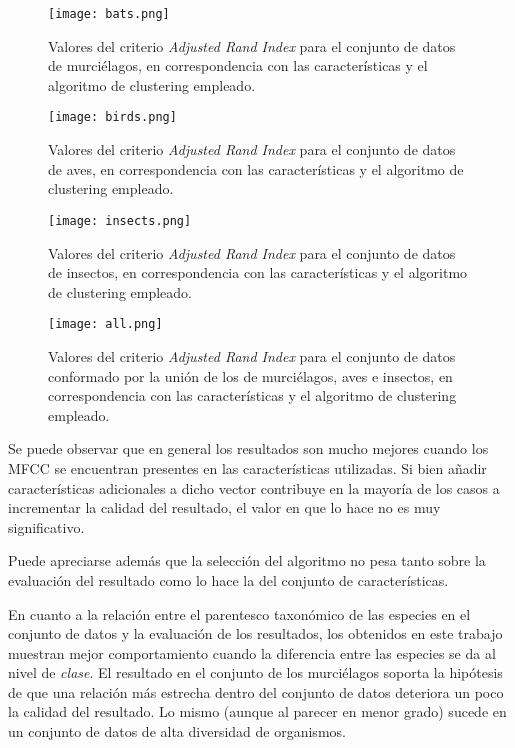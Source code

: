 \begin{figure}[!h]
    \centering
    \texttt{[image: bats.png]}
    \caption{Valores del criterio \textit{Adjusted Rand Index} para el conjunto de datos de murciélagos, en correspondencia con las características y el algoritmo de clustering empleado.}
    \label{img:bats}
\end{figure}

\begin{figure}[!h]
    \centering
    \texttt{[image: birds.png]}
    \caption{Valores del criterio \textit{Adjusted Rand Index} para el conjunto de datos de aves, en correspondencia con las características y el algoritmo de clustering empleado.}
    \label{img:birds}
\end{figure}

\begin{figure}[!h]
    \centering
    \texttt{[image: insects.png]}
    \caption{Valores del criterio \textit{Adjusted Rand Index} para el conjunto de datos de insectos, en correspondencia con las características y el algoritmo de clustering empleado.}
    \label{img:insects}
\end{figure}

\begin{figure}[!h]
    \centering
    \texttt{[image: all.png]}
    \caption{Valores del criterio \textit{Adjusted Rand Index} para el conjunto de datos conformado por la unión de los de murciélagos, aves e insectos, en correspondencia con las características y el algoritmo de clustering empleado.}
    \label{img:all}
\end{figure}

Se puede observar que en general los resultados son mucho mejores cuando los MFCC se encuentran presentes en las características utilizadas.
Si bien añadir características adicionales a dicho vector contribuye en la mayoría de los casos a incrementar la calidad del resultado, el valor en que lo hace no es muy significativo.

Puede apreciarse además que la selección del algoritmo no pesa tanto sobre la evaluación del resultado como lo hace la del conjunto de características.

En cuanto a la relación entre el parentesco taxonómico de las especies en el conjunto de datos y la evaluación de los resultados,
los obtenidos en este trabajo muestran mejor comportamiento cuando la diferencia entre las especies se da al nivel de \textit{clase}.
El resultado en el conjunto de los murciélagos soporta la hipótesis de que una relación más estrecha dentro del conjunto de datos deteriora un poco la calidad del resultado.
Lo mismo (aunque al parecer en menor grado) sucede en un conjunto de datos de alta diversidad de organismos.